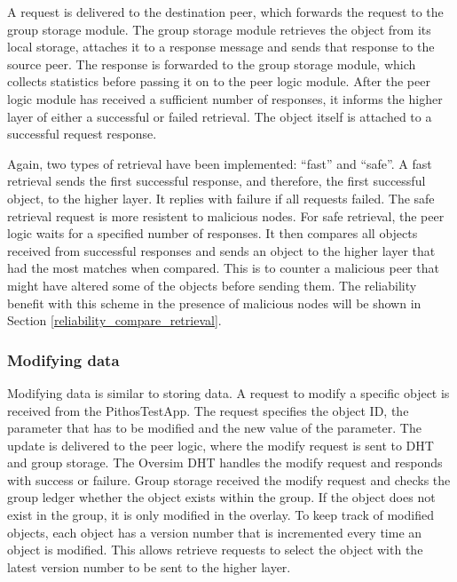    A request is delivered to the destination peer, which forwards the request to the group storage module. The group storage module retrieves the object from its local storage, attaches it to a response message and sends that response to the source peer. The response is forwarded to the group storage module, which collects statistics before passing it on to the peer logic module. After the peer logic module has received a sufficient number of responses, it informs the higher layer of either a successful or failed retrieval. The object itself is attached to a successful request response.

    Again, two types of retrieval have been implemented: ``fast'' and ``safe''. A fast retrieval sends the first successful response, and therefore, the first successful object, to the higher layer. It replies with failure if all requests failed. The safe retrieval request is more resistent to malicious nodes. For safe retrieval, the peer logic waits for a specified number of responses. It then compares all objects received from successful responses and sends an object to the higher layer that had the most matches when compared. This is to counter a malicious peer that might have altered some of the objects before sending them. The reliability benefit with this scheme in the presence of malicious nodes will be shown in Section \ref{reliability_compare_retrieval}.

    \subsubsection{Modifying data}
    \label{modify_implementation}

    Modifying data is similar to storing data. A request to modify a specific object is received from the PithosTestApp. The request specifies the object ID, the parameter that has to be modified and the new value of the parameter. The update is delivered to the peer logic, where the modify request is sent to DHT and group storage. The Oversim DHT handles the modify request and responds with success or failure. Group storage received the modify request and checks the group ledger whether the object exists within the group. If the object does not exist in the group, it is only modified in the overlay. To keep track of modified objects, each object has a version number that is incremented every time an object is modified. This allows retrieve requests to select the object with the latest version number to be sent to the higher layer.

